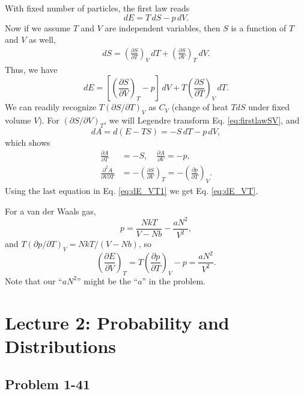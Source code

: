 \documentclass[twocolumn, 10pt]{article}
\numberwithin{equation}{section}
\newenvironment{solution}[1][\empty]
{\par\medskip\sffamily
  \textbf{\ifx\empty#1{Solution.}\relax\else{#1}\fi} \ignorespaces}
{\medskip}
\begin{document}
\begin{solution}
With fixed number of particles,
the first law reads
\begin{equation}
  dE = T \, dS - p \, dV.
  \label{eq:firstlawSV}
\end{equation}
Now if we assume $T$ and $V$ are independent variables,
then $S$ is a function of $T$ and $V$ as well,
\begin{align*}
dS = \left( \frac{ \partial S }{ \partial T } \right)_V \, dT
+ \left( \frac{ \partial S } { \partial V } \right)_T \, d V.
\end{align*}
Thus, we have
\begin{equation}
  dE =
    \left[\left( \frac{ \partial S } { \partial V } \right)_T -p \right]\, d V
  +T \left( \frac{ \partial S }{ \partial T } \right)_V \, dT.
  \label{eq:dE_VT1}
\end{equation}
We can readily recognize $T(\partial S/\partial T)_V$ as $C_V$
  (change of heat $TdS$ under fixed volume $V$).
%
For $(\partial S/\partial V)_T$,
we will Legendre transform Eq. \eqref{eq:firstlawSV}, and
$$
dA = d(E-TS) = - S \, dT - p \, dV,
$$
which shows
\begin{align*}
  \frac{\partial A } { \partial T} &= -S, \quad
  \frac{\partial A } { \partial V} = -p, \\
  \frac{\partial^2 A } { \partial V \partial T}
  &=
  -\left( \frac{\partial S }{\partial V} \right)_T
  =
  -\left( \frac{\partial p }{\partial T} \right)_V.
\end{align*}
Using the last equation in Eq. \eqref{eq:dE_VT1}
  we get Eq. \eqref{eq:dE_VT}.

For a van der Waals gas,
  $$
  p = \frac{NkT}{V-Nb} - \frac{aN^2}{V^2},
  $$
  and
  $T (\partial p/\partial T)_V = NkT/(V-Nb)$,
  so
  $$
  \left( \frac{ \partial E } { \partial V} \right)_T
  =
  T \left( \frac{ \partial p} {\partial T } \right)_V - p
  =
  \frac{ a N^2 } { V^2 }.
  $$
Note that our ``$aN^2$'' might be the ``$a$''
in the problem.
\end{solution}

\section{Lecture 2: Probability and Distributions}

\subsection{Problem 1-41}
\end{document}
